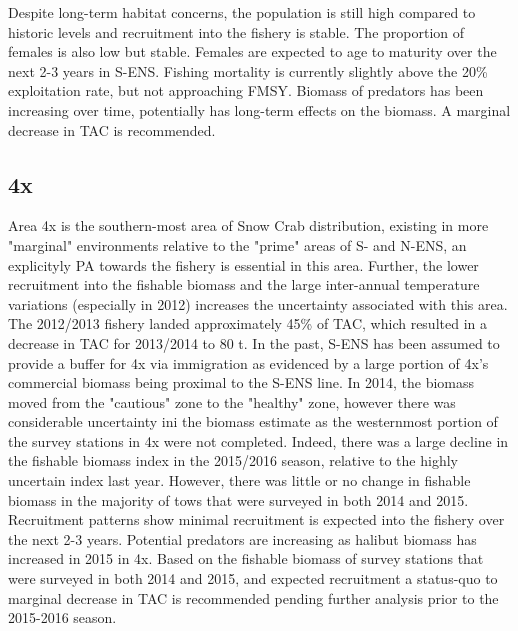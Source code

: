 \documentclass[paper=a4, fontsize=11pt]{article}
\begin{document}
Despite long-term habitat concerns, the population is still high compared to historic levels and recruitment into the fishery is stable. The proportion of females is also low but stable. Females are expected to age to maturity over the next 2-3 years in S-ENS. Fishing mortality is currently slightly above the 20\% exploitation rate, but not approaching FMSY. Biomass of predators has been increasing over time, potentially has long-term effects on the biomass. A marginal decrease in TAC is recommended. 


\subsection{4x}
Area 4x is the southern-most area of Snow Crab distribution, existing in more "marginal" environments relative to the "prime" areas of S- and N-ENS, an explicityly PA towards the fishery is essential in this area. Further, the lower recruitment into the fishable biomass and the large inter-annual temperature variations (especially in 2012) increases the uncertainty associated with this area. The 2012/2013 fishery landed approximately 45\% of TAC, which resulted in a decrease in TAC for 2013/2014 to 80 t. In the past, S-ENS has been assumed to provide a buffer for 4x via immigration as evidenced by a large portion of 4x's commercial biomass being proximal to the S-ENS line. In 2014, the biomass moved from the "cautious" zone to the "healthy" zone, however there was considerable uncertainty ini the biomass estimate as the westernmost portion of the survey stations in 4x were not completed. Indeed, there was a large decline in the fishable biomass index in the 2015/2016 season, relative to the highly uncertain index last year. However, there was little or no change in fishable biomass in the majority of tows that were surveyed in both 2014 and 2015. Recruitment patterns show minimal recruitment is expected into the fishery over the next 2-3 years. Potential predators are increasing as halibut biomass has increased in 2015 in 4x. Based on the fishable biomass of survey stations that were surveyed in both 2014 and 2015, and expected recruitment a status-quo to marginal decrease in TAC is recommended pending further analysis prior to the 2015-2016 season. 
\end{document}
